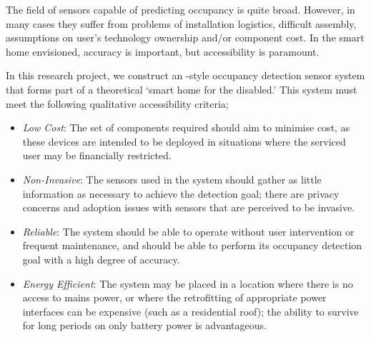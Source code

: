 \documentclass[../thesis/thesis.tex]{subfiles}
\begin{document}
The field of sensors capable of predicting occupancy is quite broad. However, in many cases they suffer from problems of installation logistics, difficult assembly, assumptions on user's technology ownership and/or component cost. In the smart home envisioned, accuracy is important, but accessibility is paramount.


In this research project, we construct an \iot-style occupancy detection sensor system that forms part of a theoretical `smart home for the disabled.' This system must meet the following qualitative accessibility criteria;


\begin{itemize}
 \item \emph{Low Cost}: The set of components required should aim to minimise cost, as these devices are intended to be deployed in situations where the serviced user may be financially restricted.
 
 \item \emph{Non-Invasive}: The sensors used in the system should gather as little information as necessary to achieve the detection goal; there are privacy concerns and adoption issues with sensors that are perceived to be invasive.
 
 \item \emph{Reliable}: The system should be able to operate without user intervention or frequent maintenance, and should be able to perform its occupancy detection goal with a high degree of accuracy.
 
 \item \emph{Energy Efficient}: The system may be placed in a location where there is no access to mains power, or where the retrofitting of appropriate power interfaces can be expensive (such as a residential roof); the ability to survive for long periods on only battery power is advantageous.
\end{itemize}
\end{document}
